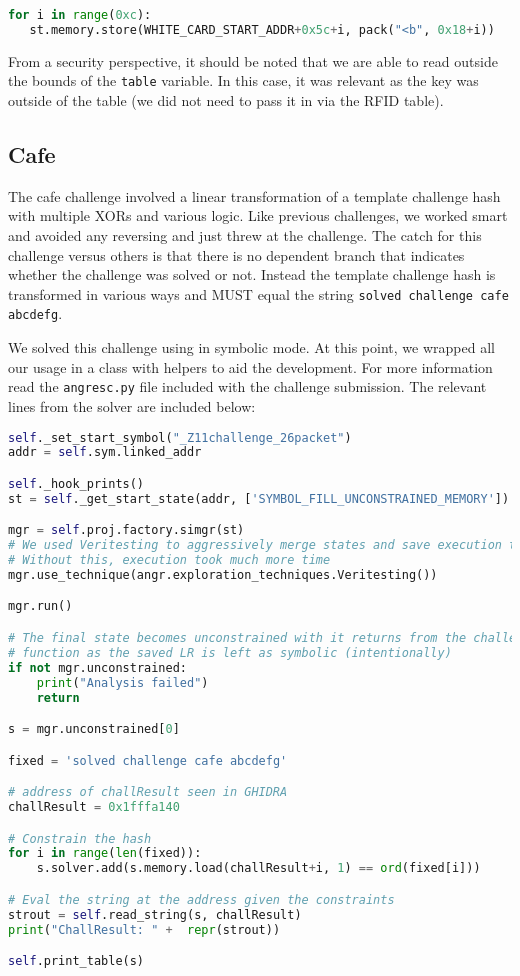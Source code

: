 \begin{lstlisting}[language=python]
for i in range(0xc):
   st.memory.store(WHITE_CARD_START_ADDR+0x5c+i, pack("<b", 0x18+i))
\end{lstlisting}

From a security perspective, it should be noted that we are able to read outside the bounds of the \texttt{table} variable. In this case, it was relevant as the key was outside of the table (we did not need to pass it in via the RFID table).

\subsection{Cafe}
The cafe challenge involved a linear transformation of a template challenge hash with multiple XORs and various logic. Like previous challenges, we worked smart and avoided any reversing and just threw \angr at the challenge. The catch for this challenge versus others is that there is no dependent branch that indicates whether the challenge was solved or not. Instead the template challenge hash is transformed in various ways and MUST equal the string \texttt{solved challenge cafe abcdefg}.

We solved this challenge using \angr in symbolic mode. At this point, we wrapped all our \angr usage in a class with helpers to aid the development. For more information read the \texttt{angresc.py} file included with the challenge submission. The relevant lines from the solver are included below:

\begin{lstlisting}[language=python]
self._set_start_symbol("_Z11challenge_26packet")
addr = self.sym.linked_addr

self._hook_prints()
st = self._get_start_state(addr, ['SYMBOL_FILL_UNCONSTRAINED_MEMORY'])

mgr = self.proj.factory.simgr(st)
# We used Veritesting to aggressively merge states and save execution time
# Without this, execution took much more time
mgr.use_technique(angr.exploration_techniques.Veritesting())

mgr.run()

# The final state becomes unconstrained with it returns from the challenge
# function as the saved LR is left as symbolic (intentionally)
if not mgr.unconstrained:
    print("Analysis failed")
    return

s = mgr.unconstrained[0]

fixed = 'solved challenge cafe abcdefg'

# address of challResult seen in GHIDRA
challResult = 0x1fffa140

# Constrain the hash
for i in range(len(fixed)):
    s.solver.add(s.memory.load(challResult+i, 1) == ord(fixed[i]))

# Eval the string at the address given the constraints
strout = self.read_string(s, challResult)
print("ChallResult: " +  repr(strout))

self.print_table(s)
\end{lstlisting}

